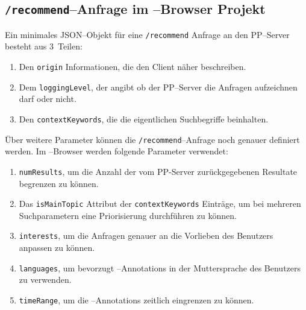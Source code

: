 \subsection{\texttt{/recommend}--Anfrage im \SECH--Browser Projekt}
Ein minimales JSON--Objekt für eine \Verb|/recommend|
Anfrage an den PP--Server besteht aus 3~Teilen:
\begin{enumerate}
     \item Den \Verb|origin| Informationen, die den Client näher beschreiben.
     \item Dem \Verb|loggingLevel|, der angibt ob der PP--Server die
    Anfragen aufzeichnen darf oder nicht.
    \item Den \Verb|contextKeywords|, die die eigentlichen
   Suchbegriffe beinhalten.
\end{enumerate}

Über weitere Parameter können die \Verb|/recommend|--Anfrage noch
genauer definiert werden. Im \SECH--Browser werden folgende
Parameter verwendet:
\begin{enumerate}
     \item \Verb|numResults|, um die Anzahl der vom PP-Server
    zurückgegebenen Resultate begrenzen zu können.
     \item Das \Verb|isMainTopic| Attribut der \Verb|contextKeywords|
    Einträge, um bei mehreren Suchparametern eine Priorisierung
    durchführen zu können.
     \item \Verb|interests|, um die Anfragen genauer an die Vorlieben
    des Benutzers anpassen zu können.
     \item \Verb|languages|, um bevorzugt \SECH--Annotations in der
    Muttersprache des Benutzers zu verwenden.
     \item \Verb|timeRange|, um die \SECH--Annotations zeitlich
    eingrenzen zu können.
\end{enumerate}

